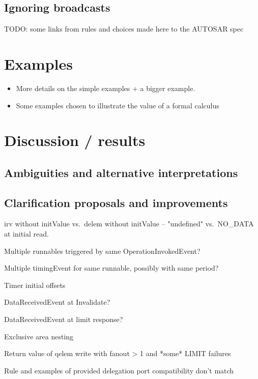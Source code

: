 \documentclass[twocolumn]{article}
\begin{document}
\subsection{Ignoring broadcasts} \label{sect:Ignore}


TODO: some links from rules and choices made here to the AUTOSAR spec

\section{Examples}
\label{sec:Examples}

\begin{itemize}
\item More details on the simple examples + a bigger example.
\item Some examples chosen to illustrate the value of a formal calculus
\end{itemize}

\section{Discussion / results}
\label{sec:Disc}

\subsection{Ambiguities and alternative interpretations}
\label{sec:DiscAmb}

\subsection{Clarification proposals and improvements}
\label{sec:DiscImp}

irv without initValue vs.\ delem without initValue -- "undefined" vs.\ NO\_DATA at initial read.

Multiple runnables triggered by same OperationInvokedEvent?

Multiple timingEvent for same runnable, possibly with same period?

Timer initial offsets

DataReceivedEvent at Invalidate?

DataReceivedEvent at limit response?

Exclusive area nesting

Return value of qelem write with fanout > 1 and *some* LIMIT failures

Rule and examples of provided delegation port compatibility don't match
\end{document}
